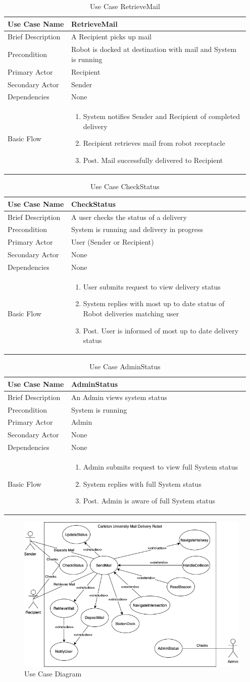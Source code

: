 \documentclass[12pt]{report}
\newcommand\tabularhead[1]{
    \begin{table}[H]
      \caption{Use Case #1}
      \begin{tabular}{|p{0.25\linewidth}|p{0.7\linewidth}|}
        \hline
        \textbf{Use Case Name} & \textbf{#1} \\
        \hline}
\newcommand\addrow[2]{#1 &#2\\ \hline}
\newcommand\addmulrow[2]{ \begin{minipage}[t][][t]{4cm}\raggedright#1\end{minipage} 
         &\begin{minipage}[t][][t]{10cm}
          \begin{enumerate} #2   \end{enumerate}
          \end{minipage} \vspace{0.1cm} \\ \hline}
\newenvironment{usecase}{\tabularhead}
    {\end{tabular}\end{table}}
\begin{document}
\begin{usecase}{RetrieveMail}
    \addrow{Brief Description}{A Recipient picks up mail}
    \addrow{Precondition}{Robot is docked at destination with mail and System is running}
    \addrow{Primary Actor}{Recipient}
    \addrow{Secondary Actor}{Sender}
    \addrow{Dependencies}{None}
    \addmulrow{Basic Flow}{
        \item System notifies Sender and Recipient of completed delivery
        \item Recipient retrieves mail from robot receptacle
        \item[Post.] Mail successfully delivered to Recipient
    }
\end{usecase}

\begin{usecase}{CheckStatus}
    \addrow{Brief Description}{A user checks the status of a delivery}
    \addrow{Precondition}{System is running and delivery in progress}
    \addrow{Primary Actor}{User (Sender or Recipient)}
    \addrow{Secondary Actor}{None}
    \addrow{Dependencies}{None}
    \addmulrow{Basic Flow}{
        \item User submits request to view delivery status
        \item System replies with most up to date status of Robot deliveries matching user
        \item[Post.] User is informed of most up to date delivery status
    }
\end{usecase}

\begin{usecase}{AdminStatus}
    \addrow{Brief Description}{An Admin views system status}
    \addrow{Precondition}{System is running}
    \addrow{Primary Actor}{Admin}
    \addrow{Secondary Actor}{None}
    \addrow{Dependencies}{None}
    \addmulrow{Basic Flow}{
        \item Admin submits request to view full System status
        \item System replies with full System status
        \item[Post.] Admin is aware of full System status
    }
\end{usecase}

\begin{figure}[H]
\caption{Use Case Diagram}
\includegraphics[scale=0.6]{images/UseCaseDiagram.png}
\centering
\end{figure}
\end{document}
